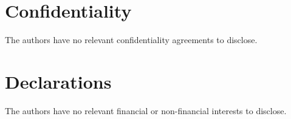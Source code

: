 \documentclass[%
a4paper,							
11pt,								
bibliography=totoc,						
abstracton=true					
]
{scrartcl}
\theoremstyle{plain}
\theoremstyle{definition}
\theoremstyle{remark}
\newcommand{\1}{\mathbbm{1}}
\begin{document}
\section*{Confidentiality}
The authors have no relevant confidentiality agreements to disclose.
\section*{Declarations}
The authors have no relevant financial or non-financial interests to disclose.
\end{document}
